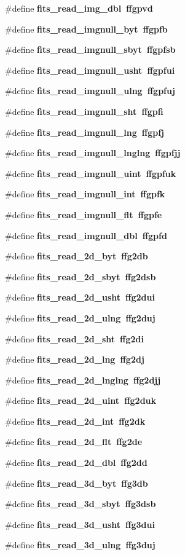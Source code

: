 \begin{CompactItemize}
\item 
\#define \bf{fits\_\-read\_\-img\_\-dbl}~ffgpvd
\item 
\#define \bf{fits\_\-read\_\-imgnull\_\-byt}~ffgpfb
\item 
\#define \bf{fits\_\-read\_\-imgnull\_\-sbyt}~ffgpfsb
\item 
\#define \bf{fits\_\-read\_\-imgnull\_\-usht}~ffgpfui
\item 
\#define \bf{fits\_\-read\_\-imgnull\_\-ulng}~ffgpfuj
\item 
\#define \bf{fits\_\-read\_\-imgnull\_\-sht}~ffgpfi
\item 
\#define \bf{fits\_\-read\_\-imgnull\_\-lng}~ffgpfj
\item 
\#define \bf{fits\_\-read\_\-imgnull\_\-lnglng}~ffgpfjj
\item 
\#define \bf{fits\_\-read\_\-imgnull\_\-uint}~ffgpfuk
\item 
\#define \bf{fits\_\-read\_\-imgnull\_\-int}~ffgpfk
\item 
\#define \bf{fits\_\-read\_\-imgnull\_\-flt}~ffgpfe
\item 
\#define \bf{fits\_\-read\_\-imgnull\_\-dbl}~ffgpfd
\item 
\#define \bf{fits\_\-read\_\-2d\_\-byt}~ffg2db
\item 
\#define \bf{fits\_\-read\_\-2d\_\-sbyt}~ffg2dsb
\item 
\#define \bf{fits\_\-read\_\-2d\_\-usht}~ffg2dui
\item 
\#define \bf{fits\_\-read\_\-2d\_\-ulng}~ffg2duj
\item 
\#define \bf{fits\_\-read\_\-2d\_\-sht}~ffg2di
\item 
\#define \bf{fits\_\-read\_\-2d\_\-lng}~ffg2dj
\item 
\#define \bf{fits\_\-read\_\-2d\_\-lnglng}~ffg2djj
\item 
\#define \bf{fits\_\-read\_\-2d\_\-uint}~ffg2duk
\item 
\#define \bf{fits\_\-read\_\-2d\_\-int}~ffg2dk
\item 
\#define \bf{fits\_\-read\_\-2d\_\-flt}~ffg2de
\item 
\#define \bf{fits\_\-read\_\-2d\_\-dbl}~ffg2dd
\item 
\#define \bf{fits\_\-read\_\-3d\_\-byt}~ffg3db
\item 
\#define \bf{fits\_\-read\_\-3d\_\-sbyt}~ffg3dsb
\item 
\#define \bf{fits\_\-read\_\-3d\_\-usht}~ffg3dui
\item 
\#define \bf{fits\_\-read\_\-3d\_\-ulng}~ffg3duj

\end{CompactItemize}
